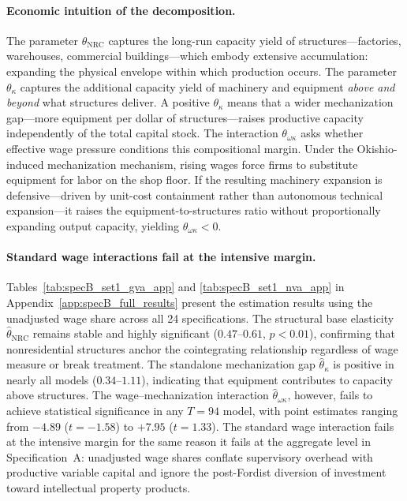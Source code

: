 \paragraph{Economic intuition of the decomposition.}
The parameter $\theta_{\text{NRC}}$ captures the long-run capacity yield of structures---factories, warehouses, commercial buildings---which embody extensive accumulation: expanding the physical envelope within which production occurs. The parameter $\theta_\kappa$ captures the additional capacity yield of machinery and equipment \emph{above and beyond} what structures deliver. A positive $\theta_\kappa$ means that a wider mechanization gap---more equipment per dollar of structures---raises productive capacity independently of the total capital stock. The interaction $\theta_{\omega\kappa}$ asks whether effective wage pressure conditions this compositional margin. Under the Okishio-induced mechanization mechanism, rising wages force firms to substitute equipment for labor on the shop floor. If the resulting machinery expansion is defensive---driven by unit-cost containment rather than autonomous technical expansion---it raises the equipment-to-structures ratio without proportionally expanding output capacity, yielding $\theta_{\omega\kappa} < 0$.

\paragraph{Standard wage interactions fail at the intensive margin.}
Tables~\ref{tab:specB_set1_gva_app} and \ref{tab:specB_set1_nva_app} in Appendix~\ref{app:specB_full_results} present the estimation results using the unadjusted wage share across all 24 specifications. The structural base elasticity $\hat{\theta}_{\text{NRC}}$ remains stable and highly significant ($0.47$--$0.61$, $p < 0.01$), confirming that nonresidential structures anchor the cointegrating relationship regardless of wage measure or break treatment. The standalone mechanization gap $\hat{\theta}_\kappa$ is positive in nearly all models ($0.34$--$1.11$), indicating that equipment contributes to capacity above structures. The wage--mechanization interaction $\hat{\theta}_{\omega\kappa}$, however, fails to achieve statistical significance in any $T = 94$ model, with point estimates ranging from $-4.89$ ($t = -1.58$) to $+7.95$ ($t = 1.33$). The standard wage interaction fails at the intensive margin for the same reason it fails at the aggregate level in Specification~A: unadjusted wage shares conflate supervisory overhead with productive variable capital and ignore the post-Fordist diversion of investment toward intellectual property products.

